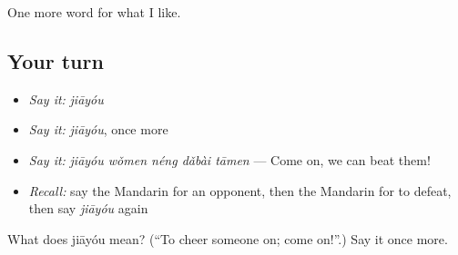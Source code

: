 \begin{grammarlens}[title={What you've built}]
One more word for what I like.
\end{grammarlens}

\subsection*{Your turn}
\begin{itemize}
\raggedright
  \item \emph{Say it:} \emph{jiāyóu}
  \item \emph{Say it:} \emph{jiāyóu}, once more
  \item \emph{Say it:} \emph{jiāyóu wǒmen néng dǎbài tāmen} — Come on, we can beat them!
  \item \emph{Recall:} say the Mandarin for an opponent, then the Mandarin for to defeat, then say \emph{jiāyóu} again
\end{itemize}

\begin{tcolorbox}[breakable,colback=teal!4,colframe=teal!35!black,title={Before you move on}]
What does jiāyóu mean? (\textquotedblleft{}To cheer someone on; come on!\textquotedblright{}.) Say it once more.
\end{tcolorbox}
